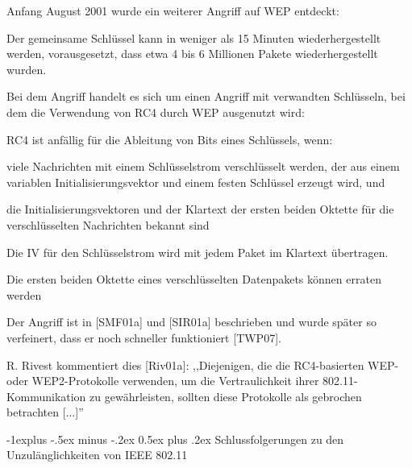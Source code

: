 \documentclass[a4paper]{article}
\makeatletter
\renewcommand{\subsection}{\@startsection{subsection}{2}{0mm}%
 {-1explus -.5ex minus -.2ex}%
 {0.5ex plus .2ex}%
 {\normalfont\normalsize\bfseries}}
\makeatother
\begin{document}
\begin{multicols}{3}
      \begin{itemize*}
            \item Anfang August 2001 wurde ein weiterer Angriff auf WEP entdeckt:
            \begin{itemize*}
                  \item Der gemeinsame Schlüssel kann in weniger als 15 Minuten wiederhergestellt werden, vorausgesetzt, dass etwa 4 bis 6 Millionen Pakete wiederhergestellt wurden.
                  \item Bei dem Angriff handelt es sich um einen Angriff mit verwandten Schlüsseln, bei dem die Verwendung von RC4 durch WEP ausgenutzt wird:
                  \begin{itemize*} \item RC4 ist anfällig für die Ableitung von Bits eines Schlüssels, wenn:
                        \begin{itemize*} \item viele Nachrichten mit einem Schlüsselstrom verschlüsselt werden, der aus einem variablen Initialisierungsvektor und einem festen Schlüssel erzeugt wird, und \item die Initialisierungsvektoren und der Klartext der ersten beiden Oktette für die verschlüsselten Nachrichten bekannt sind \end{itemize*} \item Die IV für den Schlüsselstrom wird mit jedem Paket im Klartext übertragen. \item Die ersten beiden Oktette eines verschlüsselten Datenpakets können erraten werden \end{itemize*}
                  \item Der Angriff ist in {[}SMF01a{]} und {[}SIR01a{]} beschrieben und wurde später so verfeinert, dass er noch schneller funktioniert {[}TWP07{]}.
                  \item R. Rivest kommentiert dies {[}Riv01a{]}: ,,Diejenigen, die die RC4-basierten WEP- oder WEP2-Protokolle verwenden, um die Vertraulichkeit ihrer 802.11-Kommunikation zu gewährleisten, sollten diese Protokolle als gebrochen betrachten {[}...{]}''
            \end{itemize*}
      \end{itemize*}


      \subsection{Schlussfolgerungen zu den Unzulänglichkeiten von IEEE
            802.11}


\end{multicols}
\end{document}
